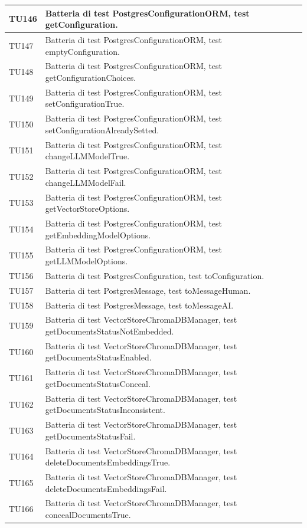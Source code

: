 \documentclass[10pt, a4paper]{article}
\begin{document}
\begin{xltabular}{\textwidth}{p{0.12\textwidth}|X}
\hline
TU146 & Batteria di test PostgresConfigurationORM, test getConfiguration. \\
\hline
TU147 & Batteria di test PostgresConfigurationORM, test emptyConfiguration. \\
\hline
TU148 & Batteria di test PostgresConfigurationORM, test getConfigurationChoices. \\
\hline
TU149 & Batteria di test PostgresConfigurationORM, test setConfigurationTrue. \\
\hline
TU150 & Batteria di test PostgresConfigurationORM, test setConfigurationAlreadySetted. \\
\hline
TU151 & Batteria di test PostgresConfigurationORM, test changeLLMModelTrue. \\
\hline
TU152 & Batteria di test PostgresConfigurationORM, test changeLLMModelFail. \\
\hline
TU153 & Batteria di test PostgresConfigurationORM, test getVectorStoreOptions. \\
\hline
TU154 & Batteria di test PostgresConfigurationORM, test getEmbeddingModelOptions. \\
\hline
TU155 & Batteria di test PostgresConfigurationORM, test getLLMModelOptions. \\
\hline
TU156 & Batteria di test PostgresConfiguration, test toConfiguration. \\
\hline
TU157 & Batteria di test PostgresMessage, test toMessageHuman. \\
\hline
TU158 & Batteria di test PostgresMessage, test toMessageAI. \\
\hline
TU159 & Batteria di test VectorStoreChromaDBManager, test getDocumentsStatusNotEmbedded. \\
\hline
TU160 & Batteria di test VectorStoreChromaDBManager, test getDocumentsStatusEnabled. \\
\hline
TU161 & Batteria di test VectorStoreChromaDBManager, test getDocumentsStatusConceal. \\
\hline
TU162 & Batteria di test VectorStoreChromaDBManager, test getDocumentsStatusInconsistent. \\
\hline
TU163 & Batteria di test VectorStoreChromaDBManager, test getDocumentsStatusFail. \\
\hline
TU164 & Batteria di test VectorStoreChromaDBManager, test deleteDocumentsEmbeddingsTrue. \\
\hline
TU165 & Batteria di test VectorStoreChromaDBManager, test deleteDocumentsEmbeddingsFail. \\
\hline
TU166 & Batteria di test VectorStoreChromaDBManager, test concealDocumentsTrue. \\

\end{xltabular}
\end{document}
